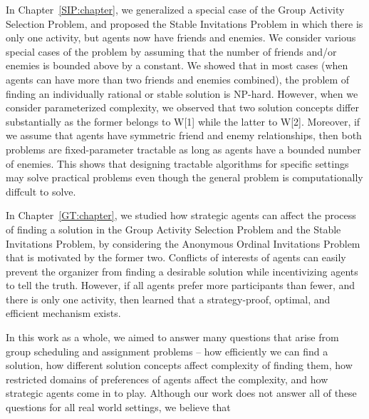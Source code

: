 In Chapter~\ref{SIP:chapter}, we generalized a special case of the Group Activity Selection Problem, and proposed the Stable Invitations Problem in which there is only one activity, but agents now have friends and enemies. We consider various special cases of the problem by assuming that the number of friends and/or enemies is bounded above by a constant. We showed that in most cases (when agents can have more than two friends and enemies combined), the problem of finding an individually rational or stable solution is NP-hard. However, when we consider parameterized complexity, we observed that two solution concepts differ substantially as the former belongs to W[1] while the latter to W[2]. Moreover, if we assume that agents have symmetric friend and enemy relationships, then both problems are fixed-parameter tractable as long as agents have a bounded number of enemies. This shows that designing tractable algorithms for specific settings may solve practical problems even though the general problem is computationally diffcult to solve. 

In Chapter~\ref{GT:chapter}, we studied how strategic agents can affect the process of finding a solution in the Group Activity Selection Problem and the Stable Invitations Problem, by considering the Anonymous Ordinal Invitations Problem that is motivated by the former two. Conflicts of interests of agents can easily prevent the organizer from finding a desirable solution while incentivizing agents to tell the truth. However, if all agents prefer more participants than fewer, and there is only one activity, then learned that a strategy-proof, optimal, and efficient mechanism exists. 

In this work as a whole, we aimed to answer many questions that arise from group scheduling and assignment problems -- how efficiently we can find a solution, how different solution concepts affect complexity of finding them, how restricted domains of preferences of agents affect the complexity, and how strategic agents come in to play. Although our work does not answer all of these questions for all real world settings, we believe that 